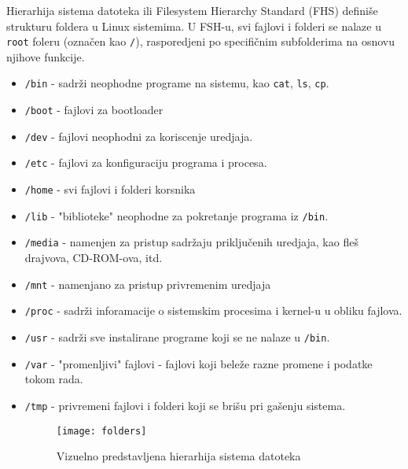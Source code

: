 Hierarhija sistema datoteka ili Filesystem Hierarchy Standard (FHS) definiše strukturu foldera u Linux sistemima. U FSH-u, svi fajlovi i folderi se nalaze u \texttt{root} foleru (označen kao \texttt{/}), rasporedjeni po specifičnim subfolderima na osnovu njihove funkcije.
\begin{itemize}
\item \texttt{/bin} - sadrži neophodne programe na sistemu, kao \texttt{cat}, \texttt{ls}, \texttt{cp}.

\item \texttt{/boot} - fajlovi za bootloader

\item \texttt{/dev} - fajlovi neophodni za koriscenje uredjaja.

\item \texttt{/etc} - fajlovi za konfiguraciju programa i procesa.

\item \texttt{/home} - svi fajlovi i folderi korsnika

\item \texttt{/lib} - "biblioteke" neophodne za pokretanje programa iz \texttt{/bin}.

\item \texttt{/media} - namenjen za pristup sadržaju priključenih uredjaja, kao fleš drajvova, CD-ROM-ova, itd.

\item \texttt{/mnt} - namenjano za pristup privremenim uredjaja

\item \texttt{/proc} - sadrži inforamacije o sistemskim procesima i kernel-u u obliku fajlova.

\item \texttt{/usr} - sadrži sve instalirane programe koji se ne nalaze u \texttt{/bin}.

\item \texttt{/var} - "promenljivi" fajlovi - fajlovi koji beleže razne promene i podatke tokom rada.

\item \texttt{/tmp} - privremeni fajlovi i folderi koji se brišu pri gašenju sistema.

\begin{figure}[H]
	\centering
	\texttt{[image: folders]}
	\caption{Vizuelno predstavljena hierarhija sistema datoteka}
\end{figure}

\end{itemize}